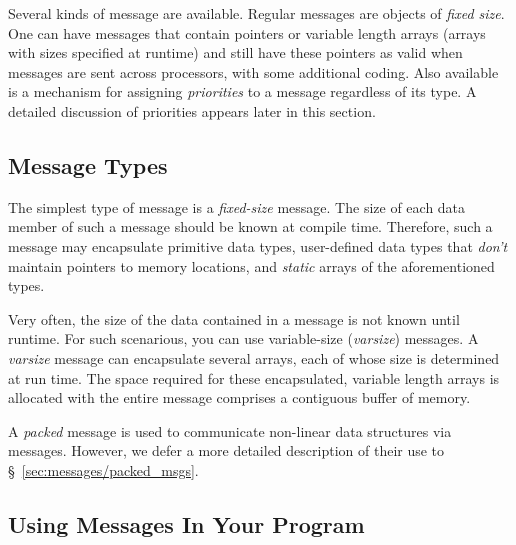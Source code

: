 
Several kinds of message are available.
Regular \charmpp{} messages are objects of
\textit{fixed size}. One can have messages that contain pointers or variable
length arrays (arrays with sizes specified at runtime) and still have these
pointers as valid when messages are sent across processors, with some
additional coding.  Also available is a mechanism for assigning
\textit{priorities} to a message regardless of its type.
A detailed discussion of priorities appears later in this section.

\subsection{Message Types}

\smallskip
{}
The simplest type of message is a {\em fixed-size} message. The size of each data member
of such a message should be known at compile time. Therefore, such a message may encapsulate
primitive data types, user-defined data types that {\em don't} maintain pointers to memory
locations, and {\em static} arrays of the aforementioned types. 

\smallskip
{}
Very often,
the size of the data contained in a message is not known until runtime. 
For such scenarious, you can use variable-size (\emph{varsize}) messages.
A {\em varsize} message can encapsulate several arrays,
each of whose size is determined at run time. 
The space required for these encapsulated, variable length arrays
is allocated with the entire message comprises a 
contiguous buffer of memory.

\smallskip
{} A {\em packed} message is used to communicate non-linear
data structures via messages. However, we defer a more detailed description of their use
to \S~\ref{sec:messages/packed_msgs}.

\subsection{Using Messages In Your Program}

